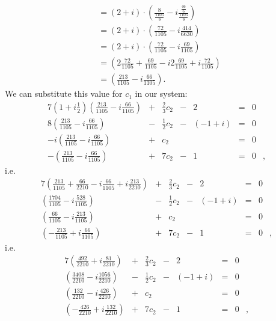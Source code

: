 \documentclass[12pt]{article}
\begin{document}
\begin{enumerate}
\begin{align*}
        &= (2 + i) \cdot (\frac{8}{\frac{1105}{9}} - i\frac{\frac{46}{6}}{\frac{1105}{9}})\\
        &= (2 + i) \cdot (\frac{72}{1105} - i\frac{414}{6630})\\
        &= (2 + i) \cdot (\frac{72}{1105} - i\frac{69}{1105})\\
        &= (2\frac{72}{1105} + \frac{69}{1105} - i2\frac{69}{1105} + i\frac{72}{1105})\\
        &= (\frac{213}{1105} - i\frac{66}{1105}).
      \end{align*}
      We can substitute this value for $c_1$ in our system:
      \begin{alignat*}{7}
        (1 + i\frac{1}{2})(\frac{213}{1105} - i\frac{66}{1105}) & {}+{} & \frac{2}{3}c_2 & {}-{} &       2 & {}={} & 0&\\
                         8(\frac{213}{1105} - i\frac{66}{1105}) & {}-{} & \frac{1}{2}c_2 & {}-{} &(-1 + i) & {}={} & 0&\\
                        -i(\frac{213}{1105} - i\frac{66}{1105}) & {}+{} &            c_2 & {} {} &         & {}={} & 0&\\
                         -(\frac{213}{1105} - i\frac{66}{1105}) & {}+{} &           7c_2 & {}-{} &       1 & {}={} & 0&,
      \end{alignat*}
      i.e.
      \begin{alignat*}{7}
        (\frac{213}{1105} + \frac{66}{2210}- i\frac{66}{1105} + i\frac{213}{2210}) & {}+{} & \frac{2}{3}c_2 & {}-{} &       2 & {}={} & 0&\\
        (\frac{1704}{1105} - i\frac{528}{1105}) & {}-{} & \frac{1}{2}c_2 & {}-{} &(-1 + i) & {}={} & 0&\\
       (\frac{66}{1105} -i\frac{213}{1105}) & {}+{} &            c_2 & {} {} &         & {}={} & 0&\\
        (-\frac{213}{1105} + i\frac{66}{1105}) & {}+{} &           7c_2 & {}-{} &       1 & {}={} & 0&,
      \end{alignat*}
      i.e.
      \begin{alignat*}{7}
        (\frac{492}{2210} + i\frac{81}{2210}) & {}+{} & \frac{2}{3}c_2 & {}-{} &       2 & {}={} & 0&\\
        (\frac{3408}{2210} - i\frac{1056}{2210}) & {}-{} & \frac{1}{2}c_2 & {}-{} &(-1 + i) & {}={} & 0&\\
       (\frac{132}{2210} -i\frac{426}{2210}) & {}+{} &            c_2 & {} {} &         & {}={} & 0&\\
        (-\frac{426}{2210} + i\frac{132}{2210}) & {}+{} &           7c_2 & {}-{} &       1 & {}={} & 0&,

\end{alignat*}
\end{enumerate}
\end{document}
